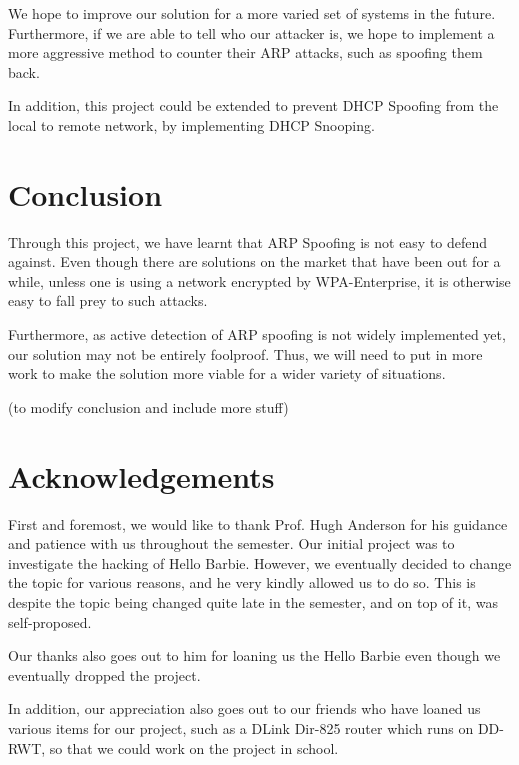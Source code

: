 \documentclass{acm_proc_article-sp}
\begin{document}
We hope to improve our solution for a more varied set of systems in the future. Furthermore, if we are able to tell who our attacker is, we hope to implement a more aggressive method to counter their ARP attacks, such as spoofing them back. 

In addition, this project could be extended to prevent DHCP Spoofing from the local to remote network, by implementing DHCP Snooping. 

\section{Conclusion}
Through this project, we have learnt that ARP Spoofing is not easy to defend against. Even though there are solutions on the market that have been out for a while, unless one is using a network encrypted by WPA-Enterprise, it is otherwise easy to fall prey to such attacks. 

Furthermore, as active detection of ARP spoofing is not widely implemented yet, our solution may not be entirely foolproof. Thus, we will need to put in more work to make the solution more viable for a wider variety of situations. 

(to modify conclusion and include more stuff) 

\section{Acknowledgements}
First and foremost, we would like to thank Prof. Hugh Anderson for his guidance and patience with us throughout the semester. Our initial project was to investigate the hacking of Hello Barbie. However, we eventually decided to change the topic for various reasons, and he very kindly allowed us to do so. This is despite the topic being changed quite late in the semester, and on top of it, was self-proposed. 

Our thanks also goes out to him for loaning us the Hello Barbie even though we eventually dropped the project. 

In addition, our appreciation also goes out to our friends who have loaned us various items for our project, such as a DLink Dir-825 router which runs on DD-RWT, so that we could work on the project in school. 

%

%
%
\end{document}
